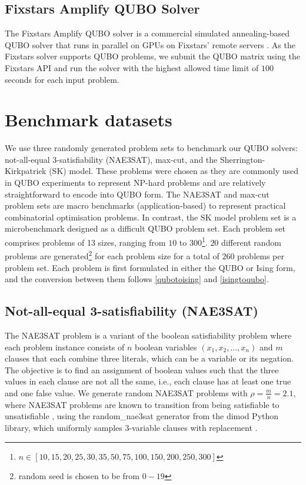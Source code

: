 
\subsection{Fixstars Amplify QUBO Solver}
The Fixstars Amplify QUBO solver is a commercial simulated annealing-based QUBO solver that runs in parallel on GPUs on Fixstars' remote servers \cite{b12}. As the Fixstars solver supports QUBO problems, we submit the QUBO matrix using the Fixstars API and run the solver with the highest allowed time limit of $100$ seconds for each input problem.

\section{Benchmark datasets}
We use three randomly generated problem sets to benchmark our QUBO solvers: not-all-equal 3-satisfiability (NAE3SAT), max-cut, and the Sherrington-Kirkpatrick (SK) model. These problems were chosen as they are commonly used in QUBO experiments to represent NP-hard problems and are relatively straightforward to encode into QUBO form. The NAE3SAT and max-cut problem sets are macro benchmarks (application-based) to represent practical combinatorial optimisation problems. In contrast, the SK model problem set is a microbenchmark designed as a difficult QUBO problem set. Each problem set comprises problems of 13 sizes, ranging from $10$ to $300$\footnote{$n \in [10,15,20,25,30,35,50,75,100,150,200,250,300]$}. $20$ different random problems are generated\footnote{random seed is chosen to be from $0-19$} for each problem size for a total of $260$ problems per problem set. Each problem is first formulated in either the QUBO or Ising form, and the conversion between them follows \autoref{qubotoising} and \autoref{isingtoqubo}.

\subsection*{Not-all-equal 3-satisfiability (NAE3SAT)}
The NAE3SAT problem is a variant of the boolean satisfiability problem where each problem instance consists of $n$ boolean variables $(x_1, x_2, ..., x_n)$ and $m$ clauses that each combine three literals, which can be a variable or its negation. The objective is to find an assignment of boolean values such that the three values in each clause are not all the same, i.e., each clause has at least one true and one false value. We generate random NAE3SAT problems with $\rho = \frac{m}{n} = 2.1$, where NAE3SAT problems are known to transition from being satisfiable to unsatisfiable \cite{nae3sattransition}, using the random\_nae3sat generator from the dimod Python library, which uniformly samples 3-variable clauses with replacement \cite{dimodrandomnae3sat}. 

